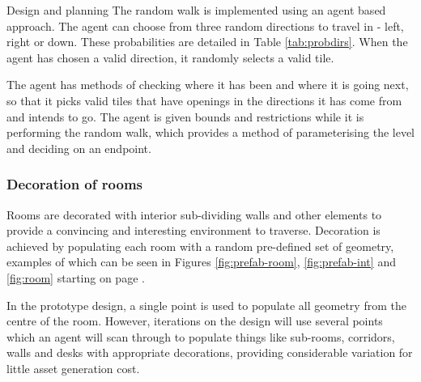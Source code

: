 \documentclass[progress]{cmpreport}
\begin{document}
\begin{section}{Design and planning}
The random walk is implemented using an agent based approach. The agent can choose from three random directions to travel in - left, right or down. These probabilities are detailed in Table \ref{tab:probdirs}. When the agent has chosen a valid direction, it randomly selects a valid tile. 

The agent has methods of checking where it has been and where it is going next, so that it picks valid tiles that have openings in the directions it has come from and intends to go. The agent is given bounds and restrictions while it is performing the random walk, which provides a method of parameterising the level and deciding on an endpoint. 

\subsubsection{Decoration of rooms}

Rooms are decorated with interior sub-dividing walls and other elements to provide a convincing and interesting environment to traverse. Decoration is achieved by populating each room with a random pre-defined set of geometry, examples of which can be seen in Figures \ref{fig:prefab-room}, \ref{fig:prefab-int} and \ref{fig:room} starting on page \pageref{fig:prefab-room}. 

In the prototype design, a single point is used to populate all geometry from the centre of the room. However, iterations on the design will use several points which an agent will scan through to populate things like sub-rooms, corridors, walls and desks with appropriate decorations, providing considerable variation for little asset generation cost.

\end{section}
\end{document}
